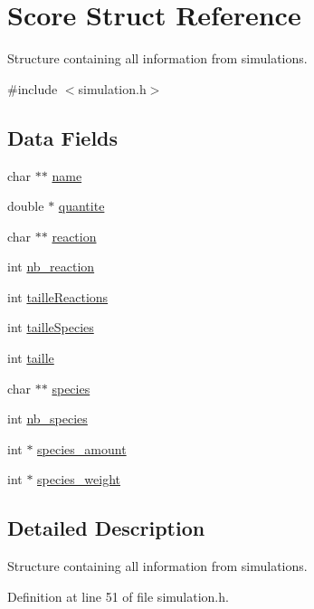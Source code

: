 \hypertarget{structScore}{
\section{Score Struct Reference}
\label{structScore}
}


Structure containing all information from simulations.  




{\ttfamily \#include $<$simulation.h$>$}

\subsection*{Data Fields}
\begin{DoxyCompactItemize}
\item 
char $\ast$$\ast$ \hyperlink{structScore_a29547e98673d89a8964a747015b2c26c}{name}
\item 
double $\ast$ \hyperlink{structScore_aadd3a70f5dc0018739a48ff13cb9fa2d}{quantite}
\item 
char $\ast$$\ast$ \hyperlink{structScore_af8245823c6e659cee49999dd3452a301}{reaction}
\item 
int \hyperlink{structScore_a9676111bf63c8d420921fe1c9187670d}{nb\_\-reaction}
\item 
int \hyperlink{structScore_a103843cc09238d77051b5a6ca4e48173}{tailleReactions}
\item 
int \hyperlink{structScore_ac5a5af5f70e341fb42ea765394d86207}{tailleSpecies}
\item 
int \hyperlink{structScore_aee1e19fc90d330de6fced582dff7102c}{taille}
\item 
char $\ast$$\ast$ \hyperlink{structScore_ae22017a9e14dbbacbc7ef1a41f880ceb}{species}
\item 
int \hyperlink{structScore_a88d07328145c2565fb2fa50c31760dbe}{nb\_\-species}
\item 
int $\ast$ \hyperlink{structScore_abb78b9e380ec83ab8f0274480c420be7}{species\_\-amount}
\item 
int $\ast$ \hyperlink{structScore_a46e74b92b29101ec9dc68255ab71a480}{species\_\-weight}
\end{DoxyCompactItemize}


\subsection{Detailed Description}
Structure containing all information from simulations. 

Definition at line 51 of file simulation.h.



